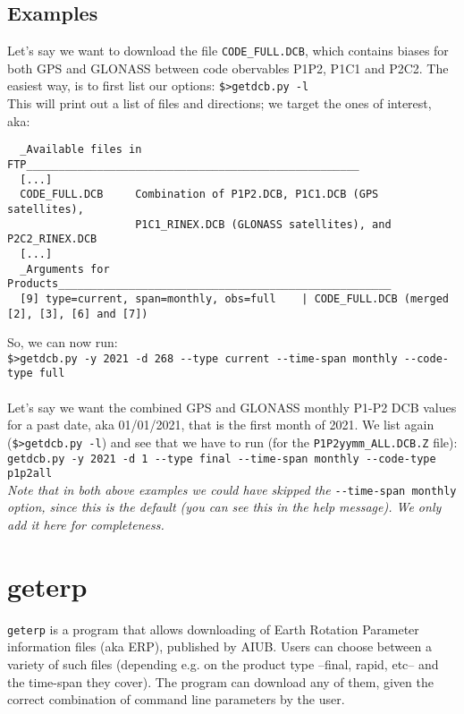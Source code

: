 \subsection{Examples}
\label{ssec:programs-getdcb}
Let's say we want to download the file \verb|CODE_FULL.DCB|, which contains biases 
for both GPS and GLONASS between code obervables P1P2, P1C1 and P2C2. The easiest way, 
is to first list our options:
\verb|$>getdcb.py -l|\\
This will print out a list of files and directions; we target the ones of interest, aka:
\begin{verbatim}
  _Available files in FTP____________________________________________________
  [...]
  CODE_FULL.DCB     Combination of P1P2.DCB, P1C1.DCB (GPS satellites),
                    P1C1_RINEX.DCB (GLONASS satellites), and P2C2_RINEX.DCB
  [...]
  _Arguments for Products____________________________________________________
  [9] type=current, span=monthly, obs=full    | CODE_FULL.DCB (merged [2], [3], [6] and [7])
\end{verbatim}
So, we can now run:\\
\verb|$>getdcb.py -y 2021 -d 268 --type current --time-span monthly --code-type full|\\
\\

Let's say we want the combined GPS and GLONASS monthly P1-P2 DCB values for a past 
date, aka 01/01/2021, that is the first month of 2021. We list again (\verb|$>getdcb.py -l|) 
and see that we have to run (for the \verb|P1P2yymm_ALL.DCB.Z| file):\\
\verb|getdcb.py -y 2021 -d 1 --type final --time-span monthly --code-type p1p2all|\\

\emph{Note that in both above examples we could have skipped the} \verb|--time-span monthly| \emph{option, 
since this is the default (you can see this in the help message). We only add it here for completeness.}


\section{geterp}
\label{sec:programs-geterp}
\verb|geterp| is a program that allows downloading of Earth Rotation Parameter information 
files (aka ERP), published by AIUB. Users can choose between a variety of 
such files (depending e.g. on the product type --final, rapid, etc-- and the time-span 
they cover). The program  can download any of them, given the correct combination of 
command line parameters by the user.

